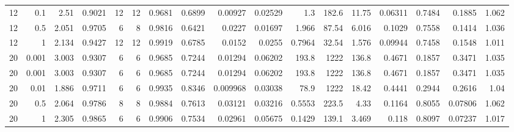 \begin{table}
\begin{tabular}{lrrrrrrrrrrrrrrrr}
12 & 0.1 & 2.51 & 0.9021 & 12 & 12 & 0.9681 & 0.6899 & 0.00927 & 0.02529 & 1.3 & 182.6 & 11.75 & 0.06311 & 0.7484 & 0.1885 & 1.062 \\
12 & 0.5 & 2.051 & 0.9705 & 6 & 8 & 0.9816 & 0.6421 & 0.0227 & 0.01697 & 1.966 & 87.54 & 6.016 & 0.1029 & 0.7558 & 0.1414 & 1.036 \\
12 & 1 & 2.134 & 0.9427 & 12 & 12 & 0.9919 & 0.6785 & 0.0152 & 0.0255 & 0.7964 & 32.54 & 1.576 & 0.09944 & 0.7458 & 0.1548 & 1.011 \\
20 & 0.001 & 3.003 & 0.9307 & 6 & 6 & 0.9685 & 0.7244 & 0.01294 & 0.06202 & 193.8 & 1222 & 136.8 & 0.4671 & 0.1857 & 0.3471 & 1.035 \\
20 & 0.001 & 3.003 & 0.9307 & 6 & 6 & 0.9685 & 0.7244 & 0.01294 & 0.06202 & 193.8 & 1222 & 136.8 & 0.4671 & 0.1857 & 0.3471 & 1.035 \\
20 & 0.01 & 1.886 & 0.9711 & 6 & 6 & 0.9935 & 0.8346 & 0.009968 & 0.03038 & 78.9 & 1222 & 18.42 & 0.4441 & 0.2944 & 0.2616 & 1.04 \\
20 & 0.5 & 2.064 & 0.9786 & 8 & 8 & 0.9884 & 0.7613 & 0.03121 & 0.03216 & 0.5553 & 223.5 & 4.33 & 0.1164 & 0.8055 & 0.07806 & 1.062 \\
20 & 1 & 2.305 & 0.9865 & 6 & 6 & 0.9906 & 0.7534 & 0.02961 & 0.05675 & 0.1429 & 139.1 & 3.469 & 0.118 & 0.8097 & 0.07237 & 1.017 \\
\bottomrule
\end{tabular}
\end{table}
